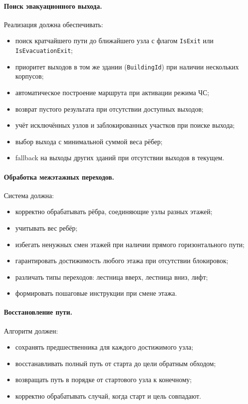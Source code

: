 \paragraph{Поиск эвакуационного выхода.} Реализация должна обеспечивать:
\begin{itemize}
\item поиск кратчайшего пути до ближайшего узла с флагом \texttt{IsExit} или \texttt{IsEvacuationExit};
\item приоритет выходов в том же здании (\texttt{BuildingId}) при наличии нескольких корпусов;
\item автоматическое построение маршрута при активации режима ЧС;
\item возврат пустого результата при отсутствии доступных выходов;
\item учёт исключённых узлов и заблокированных участков при поиске выхода;
\item выбор выхода с минимальной суммой веса рёбер;
\item fallback на выходы других зданий при отсутствии выходов в текущем.
\end{itemize}

\paragraph{Обработка межэтажных переходов.} Система должна:
\begin{itemize}
\item корректно обрабатывать рёбра, соединяющие узлы разных этажей;
\item учитывать вес ребёр;
\item избегать ненужных смен этажей при наличии прямого горизонтального пути;
\item гарантировать достижимость любого этажа при отсутствии блокировок;
\item различать типы переходов: лестница вверх, лестница вниз, лифт;
\item формировать пошаговые инструкции при смене этажа.
\end{itemize}

\paragraph{Восстановление пути.} Алгоритм должен:
\begin{itemize}
\item сохранять предшественника для каждого достижимого узла;
\item восстанавливать полный путь от старта до цели обратным обходом;
\item возвращать путь в порядке от стартового узла к конечному;
\item корректно обрабатывать случай, когда старт и цель совпадают.
\end{itemize}

